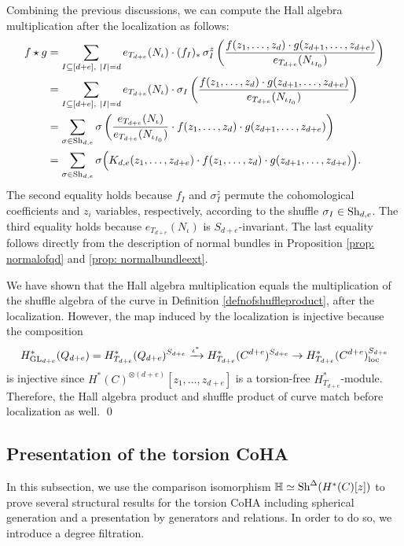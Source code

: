 \documentclass[10pt]{amsart}
\newcommand{\BH}{\mathbb{H}}
\newcommand{\+}{{}^+}
\newcommand{\GL}{\textnormal{GL}}
\newcommand{\Sh}{\textnormal{Sh}}
\newcommand{\loc}{\textnormal{loc}}
\theoremstyle{definition}
\theoremstyle {definition}
\theoremstyle {definition}
\begin{document}
Combining the previous discussions, we can compute the Hall algebra multiplication after the localization as follows:
\begin{align*}
    f\star g
    &=\sum_{I\subseteq[d+e],\ |I|=d} e_{T_{d+e}}(N_\iota)\cdot (f_I)_*\,\sigma_I^z\left(\frac{f(z_1,\dots, z_d)\cdot g(z_{d+1},\dots, z_{d+e})}{e_{T_{d+e}}(N_{\iota_{I_0}})}\right)\\
    &=\sum_{I\subseteq[d+e],\ |I|=d} e_{T_{d+e}}(N_\iota)\cdot \sigma_I\left(\frac{f(z_1,\dots, z_d)\cdot g(z_{d+1},\dots, z_{d+e})}{e_{T_{d+e}}(N_{\iota_{I_0}})}\right)\\
    &=\sum_{\sigma\in \Sh_{d,e}} \sigma\left(\frac{e_{T_{d+e}}(N_\iota)}{e_{T_{d+e}}(N_{\iota_{I_0}})}\cdot f(z_1,\dots, z_d)\cdot g(z_{d+1},\dots, z_{d+e})\right)\\
    &=\sum_{\sigma\in \Sh_{d,e}} \sigma\Big(K_{d,e}(z_1,\dots, z_{d+e})\cdot f(z_1,\dots, z_d)\cdot g(z_{d+1},\dots, z_{d+e})\Big).
\end{align*}
The second equality holds because $f_I$ and $\sigma^z_I$ permute the cohomological coefficients and $z_i$ variables, respectively, according to the shuffle $\sigma_I\in \Sh_{d,e}$. The third equality holds because $e_{T_{d+e}}(N_\iota)$ is $S_{d+e}$-invariant. The last equality follows directly from the description of normal bundles in Proposition \ref{prop: normalofqd} and \ref{prop: normalbundleext}. 

We have shown that the Hall algebra multiplication equals the multiplication of the shuffle algebra of the curve in Definition \ref{defnofshuffleproduct}, after the localization. However, the map induced by the localization is injective because the composition
$$H^*_{\GL_{d+e}}(Q_{d+e})=H^*_{T_{d+e}}(Q_{d+e})^{S_{d+e}}\xrightarrow{\iota^*} H^*_{T_{d+e}}(C^{d+e})^{S_{d+e}}\rightarrow H^*_{T_{d+e}}(C^{d+e})^{S_{d+e}}_\loc
$$
is injective since $H^*(C)^{\otimes (d+e)}[z_1,\dots, z_{d+e}]$ is a torsion-free $H^*_{T_{d+e}}$-module. Therefore, the Hall algebra product and shuffle product of curve match before localization as well. \qed
\medskip








\subsection{Presentation of the torsion CoHA}

In this subsection, we use the comparison isomorphism $\BH\simeq \Sh^{\Delta}(H^*(C)[z])$ to prove several structural results for the torsion CoHA including spherical generation and a presentation by generators and relations. In order to do so, we introduce a degree filtration. 
\end{document}
